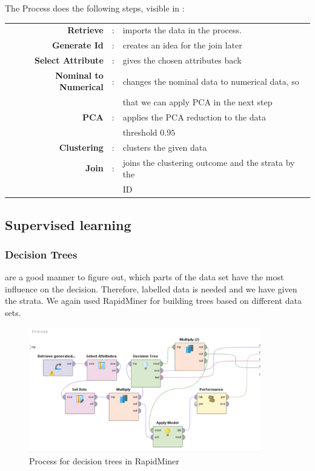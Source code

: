 The Process does the following steps, visible in :

\begin{tabular}{r c l}
	\textbf{Retrieve} & : & imports the data in the process.\\
	\textbf{Generate Id} & : & creates an idea for the join later\\
	\textbf{Select Attribute} & : & gives the chosen attributes back\\
	\textbf{Nominal to Numerical} & : & changes the nominal data to numerical data, so \\
	&&that we can apply PCA in the next step \\
	\textbf{PCA} & : & applies the PCA reduction to the data\\
	&& threshold $0.95$ \\
	\textbf{Clustering} & : &  clusters the given data \\
	\textbf{Join} & : & joins the clustering outcome and the strata by the\\
	&& ID\\
\end{tabular}	
		
		
	\subsection{Supervised learning}
	
	\subsubsection{Decision Trees} are a good manner to figure out, which parts of the data set have the most influence on the decision. Therefore, labelled data is needed and we have given the strata. We again used RapidMiner for building trees based on different data sets. 

	\vspace*{-2em}
	\begin{figure}[H]
		\centering
		\includegraphics[width = 0.9\textwidth]{DecisionTreeRapidModel.PNG}
		\caption{Process for decision trees in RapidMiner}
		\label{fig: RapDec}
		\vspace*{-1.5em}
	\end{figure}
	
